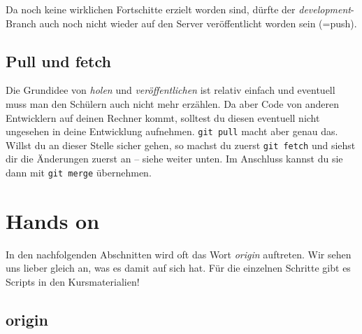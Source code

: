 \documentclass[
  letterpaper,
  DIV=11]{scrreprt}
\newenvironment{Shaded}{\begin{snugshade}}{\end{snugshade}}
\newcommand{\AttributeTok}[1]{\textcolor[rgb]{0.40,0.45,0.13}{#1}}
\newcommand{\BuiltInTok}[1]{\textcolor[rgb]{0.00,0.23,0.31}{#1}}
\newcommand{\CommentTok}[1]{\textcolor[rgb]{0.37,0.37,0.37}{#1}}
\newcommand{\ControlFlowTok}[1]{\textcolor[rgb]{0.00,0.23,0.31}{\textbf{#1}}}
\newcommand{\FunctionTok}[1]{\textcolor[rgb]{0.28,0.35,0.67}{#1}}
\newcommand{\NormalTok}[1]{\textcolor[rgb]{0.00,0.23,0.31}{#1}}
\newcommand{\OperatorTok}[1]{\textcolor[rgb]{0.37,0.37,0.37}{#1}}
\newcommand{\OtherTok}[1]{\textcolor[rgb]{0.00,0.23,0.31}{#1}}
\newcommand{\VariableTok}[1]{\textcolor[rgb]{0.07,0.07,0.07}{#1}}
\newcommand{\branch}[1]{\textit{#1}\xspace}
\begin{document}
Da noch keine wirklichen Fortschitte erzielt worden sind, dürfte der
\branch{development}-Branch auch noch nicht wieder auf den Server
veröffentlicht worden sein (=push).

\subsection{Pull und fetch}\label{pull-und-fetch}

Die Grundidee von \emph{holen} und \emph{veröffentlichen} ist relativ
einfach und eventuell muss man den Schülern auch nicht mehr erzählen. Da
aber Code von anderen Entwicklern auf deinen Rechner kommt, solltest du
diesen eventuell nicht ungesehen in deine Entwicklung aufnehmen.
\texttt{git\ pull} macht aber genau das.\\
Willst du an dieser Stelle sicher gehen, so machst du zuerst
\texttt{git\ fetch} und siehst dir die Änderungen zuerst an -- siehe
weiter unten. Im Anschluss kannst du sie dann mit \texttt{git\ merge}
übernehmen.

\section{Hands on}\label{hands-on-1}

In den nachfolgenden Abschnitten wird oft das Wort \emph{origin}
auftreten. Wir sehen uns lieber gleich an, was es damit auf sich hat.
Für die einzelnen Schritte gibt es Scripts in den Kursmaterialien!

\subsection{origin}\label{origin}

\begin{Shaded}
\end{Shaded}
\end{document}
